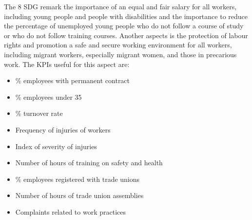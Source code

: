 \begin{minipage}[c]{0.8\textwidth}
The 8 SDG remark the importance of an equal and fair salary for all workers, including young people and people with disabilities and the importance to reduce the percentage of unemployed young people who do not follow a course of study or who do not follow training courses. Another aspects is the protection of labour rights and promotion a safe and secure working environment for all workers, including migrant workers, especially migrant women, and those in precarious work. The KPIs useful for this aspect are:
\begin{itemize}
    \item \% employees with permanent contract
    \item \% employees under 35 
    \item \% turnover rate
    \item Frequency of injuries of workers
    \item Index of severity of injuries
    \item Number of hours of training on safety and health
    \item \% employees registered with trade unions
    \item Number of hours of trade union assemblies
    \item Complaints related to work practices
\end{itemize}
\end{minipage}

